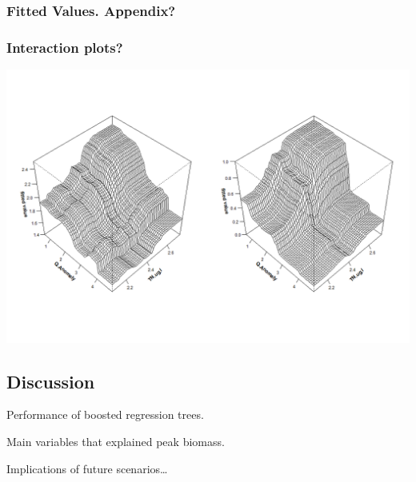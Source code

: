 \documentclass[
]{article}
\let\origfigure\figure
\let\endorigfigure\endfigure
\renewenvironment{figure}[1][2] {
    \expandafter\origfigure\expandafter[H]
} {
    \endorigfigure
}
\begin{document}
\hypertarget{fitted-values.-appendix}{%
\subsubsection{Fitted Values. Appendix?}\label{fitted-values.-appendix}}

\hypertarget{interaction-plots}{%
\subsubsection{Interaction plots?}\label{interaction-plots}}

\begin{figure}
\includegraphics[width=1\linewidth]{Manuscript_files/FIGURES/Interaction_Plots} \caption{A caption}\label{fig:unnamed-chunk-6}
\end{figure}

\hypertarget{discussion}{%
\subsection{Discussion}\label{discussion}}

Performance of boosted regression trees.

Main variables that explained peak biomass.

Implications of future scenarios\ldots{}
\end{document}
